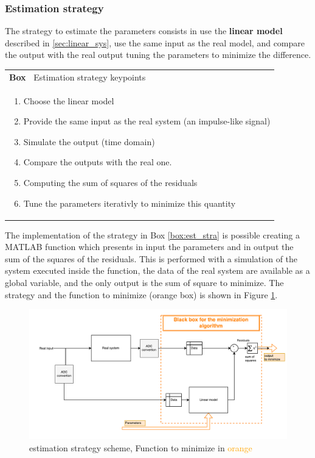 \documentclass[twosided,a4paper]{article}           %
\newcounter{box}
\newenvironment{scatola}[1]
{\refstepcounter{box}
\begin{center}
		\begin{tabular}{|p{\linewidth}|}
			\hline \textbf{Box~\thebox} #1  \\
		}
		{ 
			 \\ \hline
		\end{tabular} 
	\end{center}
 }
\begin{document}
\subsubsection{Estimation strategy}
	\label{sec:est_strat}
 The strategy to estimate the parameters consists in use the \textbf{linear model} described in \ref{sec:linear_sys}, use the same input as the real model, and compare the output with the real output tuning the parameters to minimize the difference.
\begin{scatola}{Estimation strategy keypoints}
	\label{box:est_stra}
 \begin{enumerate}
	 \item Choose the linear model
	 \item Provide the same input as the real system (an impulse-like signal)
	 \item Simulate the output (time domain)
	 \item Compare the outputs with the real one.
	 \item Computing the sum of squares of the residuals
	 \item Tune the parameters iterativly to minimize this quantity
 \end{enumerate}
\end{scatola}
The implementation of the strategy in Box \ref{box:est_stra} is possible creating a MATLAB function which presents in input the parameters and in output the sum of the squares of the residuals. This is performed with a simulation of the system executed inside the function, the data of the real system are available as a global variable, and the only output is the sum of square to minimize. The strategy and the function to minimize (orange box) is shown in Figure \ref{fig:eststrategy}.
\begin{figure}[H]
	\centering
	\includegraphics[width=\linewidth]{img/est_strategy}
	\caption{estimation strategy scheme, Function to minimize in \textcolor{orange}{orange}}
	\label{fig:eststrategy}
\end{figure}
\end{document}
